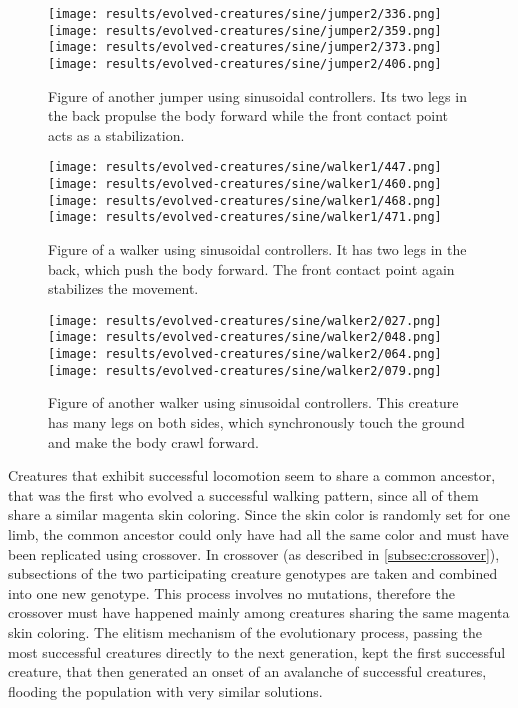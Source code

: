 \documentclass[main]{subfiles}
\begin{document}
\begin{figure}[tb]
\centering
\texttt{[image: results/evolved-creatures/sine/jumper2/336.png]}
\texttt{[image: results/evolved-creatures/sine/jumper2/359.png]}
\texttt{[image: results/evolved-creatures/sine/jumper2/373.png]}
\texttt{[image: results/evolved-creatures/sine/jumper2/406.png]}
\caption[Figure of another jumper using sinusoidal controllers.]{Figure of another jumper using sinusoidal controllers. Its two legs in the back propulse the body forward while the front contact point acts as a stabilization.}
\label{figure:successfulcreatures-jumper2}
\end{figure}

\begin{figure}[tb]
\centering
\texttt{[image: results/evolved-creatures/sine/walker1/447.png]}
\texttt{[image: results/evolved-creatures/sine/walker1/460.png]}
\texttt{[image: results/evolved-creatures/sine/walker1/468.png]}
\texttt{[image: results/evolved-creatures/sine/walker1/471.png]}
\caption[Figure of a walker using sinusoidal controllers.]{Figure of a walker using sinusoidal controllers. It has two legs in the back, which push the body forward. The front contact point again stabilizes the movement.}
\label{figure:successfulcreatures-walker1}
\end{figure}

\begin{figure}[tb]
\centering
\texttt{[image: results/evolved-creatures/sine/walker2/027.png]}
\texttt{[image: results/evolved-creatures/sine/walker2/048.png]}
\texttt{[image: results/evolved-creatures/sine/walker2/064.png]}
\texttt{[image: results/evolved-creatures/sine/walker2/079.png]}
\caption[Figure of another walker using sinusoidal controllers.]{Figure of another walker using sinusoidal controllers. This creature has many legs on both sides, which synchronously touch the ground and make the body crawl forward. }
\label{figure:successfulcreatures-walker2}
\end{figure}

Creatures that exhibit successful locomotion seem to share a common ancestor, that was the first who evolved a successful walking pattern, since all of them share a similar magenta skin coloring. %
%
Since the skin color is randomly set for one limb, the common ancestor could only have had all the same color and must have been replicated using crossover. %
%
In crossover (as described in \ref{subsec:crossover}), subsections of the two participating creature genotypes are taken and combined into one new genotype. %
%
This process involves no mutations, therefore the crossover must have happened mainly among creatures sharing the same magenta skin coloring. %
%
The elitism mechanism of the evolutionary process, passing the most successful creatures directly to the next generation, kept the first successful creature, that then generated an onset of an avalanche of successful creatures, flooding the population with very similar solutions. 
\end{document}
